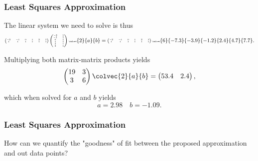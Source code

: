\begin{frame}
	\frametitle{Least Squares Approximation}
	\begin{presentation_example}
		The linear system we need to solve is thus
		\begin{equation*}
			\fontsize{4}{4} \selectfont
			\begin{pmatrix} -2 & -1 & 0 & 1 & 2 & 3 \\ 1 & 1 & 1 & 1 & 1 & 1 \end{pmatrix}\begin{pmatrix} -2 & 1 \\ -1 & 1 \\0 & 1 \\1 & 1 \\2 & 1 \\3 & 1 \end{pmatrix} \colvec{2}{a}{b} = \begin{pmatrix} -2 & -1 & 0 & 1 & 2 & 3 \\ 1 & 1 & 1 & 1 & 1 & 1 \end{pmatrix} \colvec{6}{-7.3}{-3.9}{-1.2}{2.4}{4.7}{7.7}.
		\end{equation*}

		Multiplying both matrix-matrix products yields
		\begin{equation*}
			\begin{pmatrix} 19 & 3 \\ 3 & 6 \end{pmatrix} \colvec{2}{a}{b} = \begin{pmatrix} 53.4 & 2.4 \end{pmatrix},
		\end{equation*}

		which when solved for $a$ and $b$ yields
		\begin{equation*}
			a = 2.98\quad b=-1.09.
		\end{equation*}
	\end{presentation_example}
\end{frame}

\begin{frame}
	\frametitle{Least Squares Approximation}
	How can we quantify the "goodness" of fit between the proposed approximation and out data points?
\end{frame}

